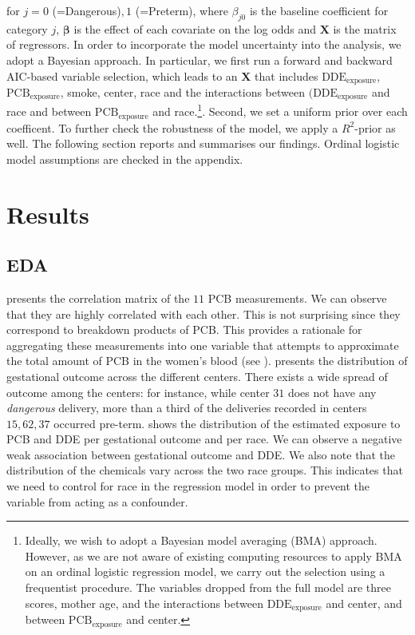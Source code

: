 \documentclass[10pt]{jmlr}%
\begin{document}
for $j=0$ (=Dangerous)$,1$ (=Preterm), where $\beta_{j0}$ is the baseline coefficient for category $j$, $\boldsymbol{\beta}$ is the effect of each covariate on the log odds and $\mathbf{X}$ is the matrix of regressors. In order to incorporate the model uncertainty into the analysis, we adopt a Bayesian approach. In particular, we first run a forward and backward AIC-based variable selection, which leads to an $\mathbf{X}$ that includes $\text{DDE}_{\text{exposure}}$, $\text{PCB}_{\text{exposure}}$, smoke, center, race and the interactions between $(\text{DDE}_{\text{exposure}}$ and race and between $\text{PCB}_{\text{exposure}}$ and race.\footnote{Ideally, we wish to adopt a Bayesian model averaging (BMA) approach. However, as we are not aware of existing computing resources to apply BMA on an ordinal logistic regression model, we carry out the selection using a frequentist procedure. The variables dropped from the full model are three scores, mother age, and the interactions between $\text{DDE}_{\text{exposure}}$ and center, and between $\text{PCB}_{\text{exposure}}$ and center.}. Second, we set a uniform prior over each coefficent. To further check the robustness of the model, we apply a $R^2$-prior as well. The following section reports and summarises our findings. Ordinal logistic model assumptions are checked in the appendix.

\section{Results}
\label{sec:results}

\subsection{EDA}

 presents the correlation matrix of the $11$ PCB measurements. We can observe that they are highly correlated with each other. This is not surprising since they correspond to breakdown products of PCB. This provides a rationale for aggregating these measurements into one variable that attempts to approximate the total amount of PCB in the women's blood (see ).  presents the distribution of gestational outcome across the different centers. There exists a wide spread of outcome among the centers: for instance, while center $31$ does not have any \textit{dangerous} delivery, more than a third of the deliveries recorded in centers $15, 62, 37$ occurred pre-term.  shows the distribution of the estimated exposure to PCB and DDE per gestational outcome and per race. We can observe a negative weak association between gestational outcome and DDE. We also note that the distribution of the chemicals vary across the two race groups. This indicates that we need to control for race in the regression model in order to prevent the variable from acting as a confounder.
\end{document}
